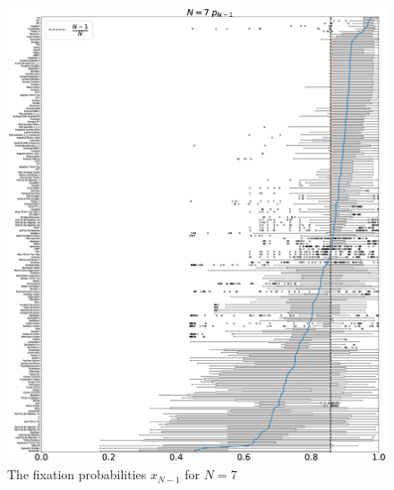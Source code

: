 \documentclass[10pt,letterpaper]{article}
\begin{document}
\begin{figure}[!hbtp]
    \centering
    \includegraphics[draft, width=\textwidth]{./Fig29.eps}
    \caption{The fixation probabilities \(x_{N-1}\) for \(N=7\)}
\end{figure}
\end{document}
